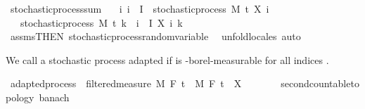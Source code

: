 \begin{isabellebody}
\endisatagproof
{\isafoldproof}%
%
\isadelimproof
%
\endisadelimproof
\isanewline
\isanewline
{}\isamarkupfalse%
\ stochastic{\isacharunderscore}{\kern0pt}process{\isacharunderscore}{\kern0pt}sum{\isacharcolon}{\kern0pt}\isanewline
\ \ \ {\isachardoublequoteopen}{\isasymAnd}i{\isachardot}{\kern0pt}\ i\ {\isasymin}\ I\ {\isasymLongrightarrow}\ stochastic{\isacharunderscore}{\kern0pt}process\ M\ t\ {\isacharparenleft}{\kern0pt}X\ i{\isacharparenright}{\kern0pt}{\isachardoublequoteclose}\isanewline
\ \ \ {\isachardoublequoteopen}stochastic{\isacharunderscore}{\kern0pt}process\ M\ t\ {\isacharparenleft}{\kern0pt}{\isasymlambda}k\ {\isasymxi}{\isachardot}{\kern0pt}\ {\isasymSum}i\ {\isasymin}\ I{\isachardot}{\kern0pt}\ X\ i\ k\ {\isasymxi}{\isacharparenright}{\kern0pt}{\isachardoublequoteclose}%
\isadelimproof
\ %
\endisadelimproof
%
\isatagproof
{}\isamarkupfalse%
\ assms{\isacharbrackleft}{\kern0pt}THEN\ stochastic{\isacharunderscore}{\kern0pt}process{\isachardot}{\kern0pt}random{\isacharunderscore}{\kern0pt}variable{\isacharbrackright}{\kern0pt}\ \isamarkupfalse%
\ {\isacharparenleft}{\kern0pt}unfold{\isacharunderscore}{\kern0pt}locales{\isacharcomma}{\kern0pt}\ auto{\isacharparenright}{\kern0pt}%
\endisatagproof
{\isafoldproof}%
%
\isadelimproof
%
\endisadelimproof
%
\isadelimdocument
%
\endisadelimdocument
%
\isatagdocument
%
\isamarkuptrue%
%
\endisatagdocument
{\isafolddocument}%
%
\isadelimdocument
%
\endisadelimdocument
%
\begin{isamarkuptext}%
We call a stochastic process  adapted if  is -borel-measurable for all indices .%
\end{isamarkuptext}\isamarkuptrue%
\isamarkupfalse%
\ adapted{\isacharunderscore}{\kern0pt}process\ {\isacharequal}{\kern0pt}\ filtered{\isacharunderscore}{\kern0pt}measure\ M\ F\ t\ \ M\ F\ t\ \ X\ {\isacharcolon}{\kern0pt}{\isacharcolon}{\kern0pt}\ {\isachardoublequoteopen}{\isacharunderscore}{\kern0pt}\ {\isasymRightarrow}\ {\isacharunderscore}{\kern0pt}\ {\isasymRightarrow}\ {\isacharunderscore}{\kern0pt}\ {\isacharcolon}{\kern0pt}{\isacharcolon}{\kern0pt}\ {\isacharbraceleft}{\kern0pt}second{\isacharunderscore}{\kern0pt}countable{\isacharunderscore}{\kern0pt}topology{\isacharcomma}{\kern0pt}\ banach{\isacharbraceright}{\kern0pt}{\isachardoublequoteclose}\ {\isacharplus}{\kern0pt}\isanewline

\end{isabellebody}
